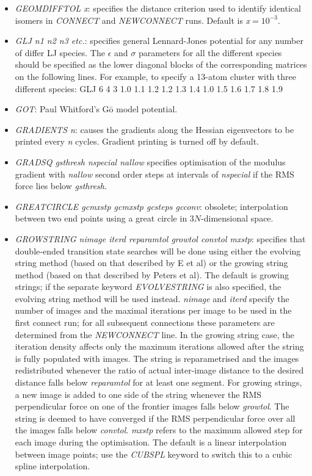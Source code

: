 \documentclass[12pt,a4paper,dvips]{article}
\begin{document}
\begin{itemize}
\item {\it GEOMDIFFTOL x\/}: specifies the distance criterion used to identify identical isomers
in {\it CONNECT\/} and {\it NEWCONNECT\/} runs. Default is {\it x}$=10^{-3}$.

\item {\it GLJ n1 n2 n3 etc.}: specifies general Lennard-Jones potential for any number of
differ LJ species.
The $\epsilon$ and $\sigma$ parameters for all the different species should be specified as
the lower diagonal blocks of the corresponding matrices on the following lines.
For example, to specify a 13-atom cluster with three different species:
{\obeylines
GLJ 6 4 3
1.0
1.1 1.2
1.2 1.3 1.4
1.0
1.5 1.6
1.7 1.8 1.9
}

\item {\it GOT\/}: Paul Whitford's G\={o} model potential.

\item {\it GRADIENTS n\/}: causes the gradients along the Hessian
eigenvectors to be printed every {\it n\/} cycles. Gradient printing is turned off by default.

\item {\it GRADSQ gsthresh nspecial nallow\/} specifies optimisation of the modulus gradient
with {\it nallow\/} second order steps at intervals of {\it nspecial\/} 
if the RMS force lies below {\it gsthresh\/}.

\item {\it GREATCIRCLE gcmxstp gcmxstp gcsteps gcconv\/}: obsolete;
interpolation between two end points using a great circle in $3N$-dimensional
space.

\item {\it GROWSTRING nimage iterd reparamtol growtol convtol mxstp\/}:
  specifies that double-ended transition state searches will be done using
  either the evolving string method (based on that described by E et
  al\cite{ERV02}) or the growing string method (based on that described by
  Peters et al\cite{PetersHBC04}). The default is growing strings; if the
  separate keyword {\it EVOLVESTRING} is also specified, the evolving string
  method will be used instead. {\it nimage\/} and {\it iterd\/} specify the
  number of images and the maximal iterations per image to be used in the
  first connect run; for all subsequent connections these parameters are
  determined from the {\it NEWCONNECT\/} line. In the growing string case, the
  iteration density affects only the maximum iterations allowed after the
  string is fully populated with images. The string is reparametrised and the
  images redistributed whenever the ratio of actual inter-image distance to
  the desired distance falls below {\it reparamtol\/} for at least one
  segment.  For growing strings, a new image is added to one side of the
  string whenever the RMS perpendicular force on one of the frontier images
  falls below {\it growtol\/}. The string is deemed to have converged if the
  RMS perpendicular force over all the images falls below {\it convtol\/}.
  {\it mxstp\/} refers to the maximum allowed step for each image during the
  optimisation. The default is a linear interpolation between image points;
  use the {\it CUBSPL\/} keyword to switch this to a cubic spline interpolation.


\end{itemize}
\end{document}
